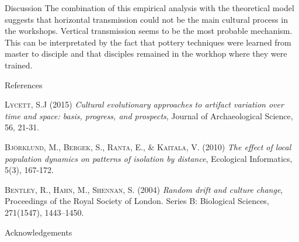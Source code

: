 \documentclass[final]{beamer}
\newcommand{\memo}[2]{\textcolor{#1}{#2}}
\newcommand{\xavi}[1]{\memo{orange}{#1\\}}
\newlength{\onecolwid}
\begin{document}
\begin{frame}[t]
\begin{columns}[t]
\begin{column}{\onecolwid}
\begin{block}{Discussion}
The combination of this empirical analysis with the theoretical model suggests that horizontal transmission could not be the main cultural process in the workshops. Vertical transmission seems to be the most probable mechanism. This can be interpretated by the fact that pottery techniques were learned from master to disciple and that disciples remained in the workhop where they were trained.
 

\end{block}

\begin{block}{References}
\small

\begin{thebibliography}{50}


\textsc{Lycett, S.J (2015)}
\textit{Cultural evolutionary approaches to artifact variation over time and space: basis, progress, and prospects}, Journal of Archaeological Science, 56, 21-31.

\textsc{Bj\"{o}rklund, M., Bergek, S., Ranta, E., \& Kaitala, V. (2010)}
\textit{The effect of local population dynamics on patterns of isolation by distance}, Ecological Informatics, 5(3), 167-172.

\textsc{Bentley, R., Hahn, M., Shennan, S. (2004)}
\textit{Random drift and culture change}, Proceedings of the Royal Society of London. Series B: Biological Sciences, 271(1547), 1443--1450.


\end{thebibliography}
%	

\end{block}



\begin{block}{Acknowledgements}

\small{}


\end{block}
\end{column}
\end{columns}
\end{frame}
\end{document}

